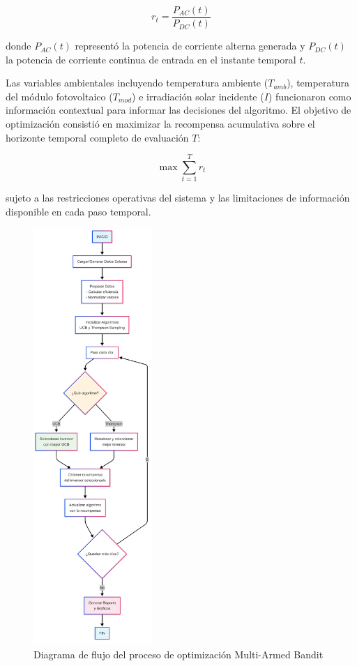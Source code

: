 \documentclass[12pt,a4paper]{article}
\begin{document}
\begin{equation}
r_t = \frac{P_{AC}(t)}{P_{DC}(t)}
\end{equation}

donde $P_{AC}(t)$ representó la potencia de corriente alterna generada y $P_{DC}(t)$ la potencia de corriente continua de entrada en el instante temporal $t$.

Las variables ambientales incluyendo temperatura ambiente ($T_{amb}$), temperatura del módulo fotovoltaico ($T_{mod}$) e irradiación solar incidente ($I$) funcionaron como información contextual para informar las decisiones del algoritmo. El objetivo de optimización consistió en maximizar la recompensa acumulativa sobre el horizonte temporal completo de evaluación $T$:

\begin{equation}
\max \sum_{t=1}^{T} r_t
\end{equation}

sujeto a las restricciones operativas del sistema y las limitaciones de información disponible en cada paso temporal.

\begin{figure}[h!]
\centering
\includegraphics[width=0.4\textwidth]{figura2.png}
\caption{Diagrama de flujo del proceso de optimización Multi-Armed Bandit}
\label{fig:flowchart}
\end{figure}
\end{document}
